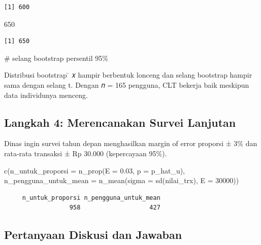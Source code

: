 \documentclass[
  indonesian,
  letterpaper,
]{book}
\newenvironment{Shaded}{\begin{snugshade}}{\end{snugshade}}
\newcommand{\AttributeTok}[1]{\textcolor[rgb]{0.40,0.45,0.13}{#1}}
\newcommand{\CommentTok}[1]{\textcolor[rgb]{0.37,0.37,0.37}{#1}}
\newcommand{\DecValTok}[1]{\textcolor[rgb]{0.68,0.00,0.00}{#1}}
\newcommand{\FloatTok}[1]{\textcolor[rgb]{0.68,0.00,0.00}{#1}}
\newcommand{\FunctionTok}[1]{\textcolor[rgb]{0.28,0.35,0.67}{#1}}
\newcommand{\NormalTok}[1]{\textcolor[rgb]{0.00,0.23,0.31}{#1}}
\begin{document}
\begin{verbatim}
[1] 600
\end{verbatim}

\begin{Shaded}
\begin{Highlighting}[]
\DecValTok{650}
\end{Highlighting}
\end{Shaded}

\begin{verbatim}
[1] 650
\end{verbatim}

\begin{Shaded}
\begin{Highlighting}[]
\CommentTok{\# selang bootstrap persentil 95\%}
\end{Highlighting}
\end{Shaded}

Distribusi bootstrap ̄ 𝑥 hampir berbentuk lonceng dan selang bootstrap
hampir sama dengan selang t. Dengan 𝑛 = 165 pengguna, CLT bekerja baik
meskipun data individunya menceng.

\subsection{Langkah 4: Merencanakan Survei
Lanjutan}\label{langkah-4-merencanakan-survei-lanjutan}

Dinas ingin survei tahun depan menghasilkan margin of error proporsi ±
3\% dan rata-rata transaksi ± Rp 30.000 (kepercayaan 95\%).

\begin{Shaded}
\begin{Highlighting}[]
\FunctionTok{c}\NormalTok{(}\AttributeTok{n\_untuk\_proporsi =} \FunctionTok{n\_prop}\NormalTok{(}\AttributeTok{E =} \FloatTok{0.03}\NormalTok{, }\AttributeTok{p =}\NormalTok{ p\_hat\_u),}
\AttributeTok{n\_pengguna\_untuk\_mean =} \FunctionTok{n\_mean}\NormalTok{(}\AttributeTok{sigma =} \FunctionTok{sd}\NormalTok{(nilai\_trx), }\AttributeTok{E =} \DecValTok{30000}\NormalTok{))}
\end{Highlighting}
\end{Shaded}

\begin{verbatim}
     n_untuk_proporsi n_pengguna_untuk_mean 
                  958                   427 
\end{verbatim}

\subsection{Pertanyaan Diskusi dan
Jawaban}\label{pertanyaan-diskusi-dan-jawaban}
\end{document}
